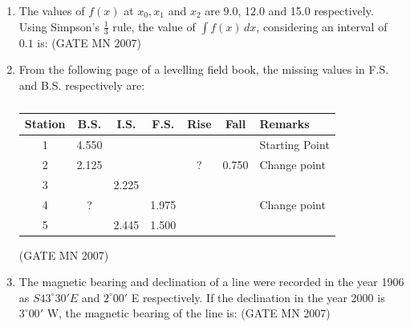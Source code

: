 \documentclass[journal]{IEEEtran}
\begin{document}
\begin{enumerate}
\item The values of $f(x)$ at $x_0, x_1$ and $x_2$ are 9.0, 12.0 and 15.0 respectively. Using Simpson's $\frac{1}{3}$ rule, the value of $\int f(x) \, dx$, considering an interval of $0.1$ is:
	\hfill (GATE MN 2007)
\begin{enumerate}
\end{enumerate}


\item From the following page of a levelling field book, the missing values in F.S. and B.S. respectively are:

\begin{table}[H]
    \centering\normalsize
\begin{tabular}{|c|c|c|c|c|c|l|}
\hline
Station & B.S. & I.S. & F.S. & Rise & Fall & Remarks \\
\hline
1 & 4.550 &     &     &      &      & Starting Point \\
\hline
2 & 2.125 &     &     &  ?    & 0.750 & Change point \\
\hline
3 &       & 2.225 &     &      &      &  \\
\hline
4 &    ?   &     & 1.975 &      &      & Change point \\
\hline
5 &       & 2.445 & 1.500 &      &      &  \\
\hline
\end{tabular}
    \caption*{}
    \label{tab:Q69}
\end{table}
\hfill (GATE MN 2007)
\begin{enumerate}
\end{enumerate}


\item The magnetic bearing and declination of a line were recorded in the year 1906 as $S43^\circ 30' E$ and $2^\circ 00'$ E respectively. If the declination in the year 2000 is $3^\circ 00'$ W, the magnetic bearing of the line is:
	\hfill (GATE MN 2007)
\begin{enumerate}
\end{enumerate}



\end{enumerate}
\end{document}
